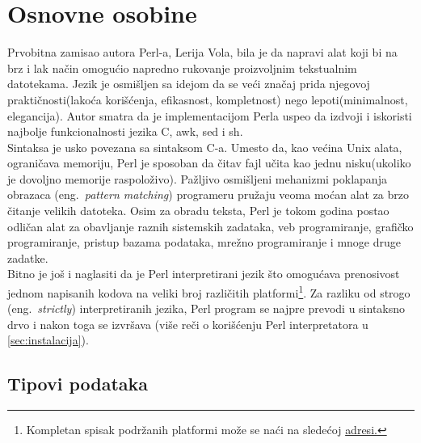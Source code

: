\documentclass[a4paper]{article}
\begin{document}
\section{Osnovne osobine}
\label{sec:osobine}

Prvobitna zamisao autora Perl-a, Lerija Vola, bila je da napravi alat koji bi na brz i lak način omogućio napredno rukovanje proizvoljnim tekstualnim datotekama. Jezik je osmišljen sa idejom da se veći značaj prida njegovoj praktičnosti(lakoća korišćenja, efikasnost, kompletnost) nego lepoti(minimalnost, elegancija). Autor smatra da je implementacijom Perla uspeo da izdvoji i iskoristi najbolje funkcionalnosti jezika C, awk, sed i sh\cite{wallperl}.\\
Sintaksa je usko povezana sa sintaksom C-a. Umesto da, kao većina Unix alata, ograničava memoriju, Perl je sposoban da čitav fajl učita kao jednu nisku(ukoliko je dovoljno memorije raspoloživo). Pažljivo osmišljeni mehanizmi poklapanja obrazaca (eng.~{\em pattern matching}) programeru pružaju veoma moćan alat za brzo čitanje velikih datoteka.
Osim za obradu teksta, Perl je tokom godina postao odličan alat za obavljanje raznih sistemskih zadataka, veb programiranje, grafičko programiranje, pristup bazama podataka, mrežno programiranje i mnoge druge zadatke. \\ 

Bitno je još i naglasiti da je Perl interpretirani jezik što omogućava prenosivost jednom napisanih kodova na veliki broj različitih platformi\footnote{Kompletan spisak podržanih platformi može se naći na sledećoj \href{https://perldoc.perl.org/perlport.html#Supported-Platforms}{adresi.}}. Za razliku od strogo (eng.~{\em strictly}) interpretiranih jezika, Perl program se najpre prevodi u sintaksno drvo i nakon toga se izvršava (više reči o korišćenju Perl interpretatora u 
\ref{sec:instalacija}).

\subsection{Tipovi podataka}
\end{document}
